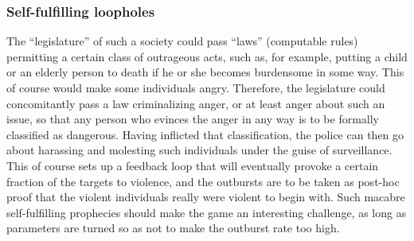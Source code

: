\subsubsection{Self-fulfilling loopholes}

The ``legislature'' of such a society could pass ``laws'' (computable rules)
permitting a certain class of outrageous acts, such as, for example, putting
a child or an elderly person to death if he or she becomes burdensome in
some way.
This of course would make some individuals angry.
Therefore, the legislature could concomitantly pass a law criminalizing anger,
or at least anger about such an issue, so that any person who evinces the
anger in any way is to be formally classified as dangerous.
Having inflicted that classification, the police can then go about
harassing and molesting such individuals under the guise of
surveillance.
This of course sets up a feedback loop that will eventually provoke a certain
fraction of the targets to violence, and the outbursts are to be taken as
post-hoc proof that the violent individuals really were violent to begin with.
Such macabre self-fulfilling prophecies should make the game an interesting
challenge, as long as parameters are turned so as not to make the outburst
rate too high.